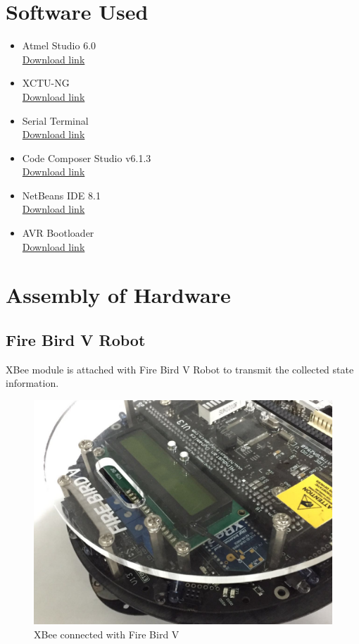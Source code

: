 \documentclass[a4paper,12pt,oneside]{book}
\begin{document}
\section{Software Used}
\begin{itemize}
  \item Atmel Studio 6.0\\
  \href{http://www.atmel.com/forms/software-download.aspx?target=tcm:26-41305}{ Download link}
  \item XCTU-NG\\
  \href{http://www.digi.com/products/XBee-rf-solutions/xctu-software/xctu}{ Download link}
  \item Serial Terminal\\
  \href{http://www.nex-robotics.com/images/downloads/Terminal\%20Setup.zip}{Download link}
  \item Code Composer Studio v6.1.3\\
  \href{http://www.ti.com/tool/ccstudio}{Download link}


  \item NetBeans IDE 8.1\\
  \href{https://netbeans.org/downloads/}{Download link}
  \item AVR Bootloader\\
  \href{http://www.nex-robotics.com/images/downloads/AVR\%20Boot\%20Loader.zip}{Download link}
\end{itemize}
\newpage
\section{Assembly of Hardware}
\subsection{Fire Bird V Robot}
XBee module is attached with Fire Bird V Robot to transmit the collected state information.
\begin{figure}[h]
        \centering
        \includegraphics[scale=0.19]{XBee_connected}
        \caption{XBee connected with Fire Bird V}
      \end{figure}
\end{document}
